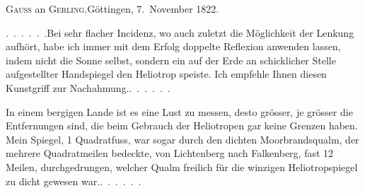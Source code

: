 \begin{center}
\textsc{Gauss} an \textsc{Gerling}.\quad Göttingen, 7.~November 1822.
\end{center}

\par\noindent\hspace*{\parindent}\mbox{.\ .\ .\ .\ .\ .}\quad Bei sehr flacher Incidenz, wo auch zuletzt die Möglichkeit der
Lenkung aufhört, habe ich immer mit dem  Erfolg doppelte
Reflexion anwenden lassen, indem nicht die Sonne selbst, sondern ein auf der
Erde an schicklicher Stelle aufgestellter Handspiegel den Heliotrop speiste.
Ich empfehle Ihnen diesen Kunstgriff zur Nachahmung.\quad\mbox{.\ .\ .\ .\ .\ .}

\par\noindent\hspace*{\parindent}In einem bergigen Lande ist es eine Lust zu messen, desto grösser, je
grösser die Entfernungen sind, die beim Gebrauch der Heliotropen gar keine
Grenzen haben. Mein  Spiegel, 1 Quadratfuss, war sogar durch den
dichten Moorbrandsqualm, der mehrere Quadratmeilen bedeckte, von
Lichtenberg nach Falkenberg, fast 12 Meilen, durchgedrungen, welcher Qualm freilich
für die winzigen Heliotropspiegel zu dicht gewesen war.\quad\mbox{.\ .\ .\ .\ .\ .}
